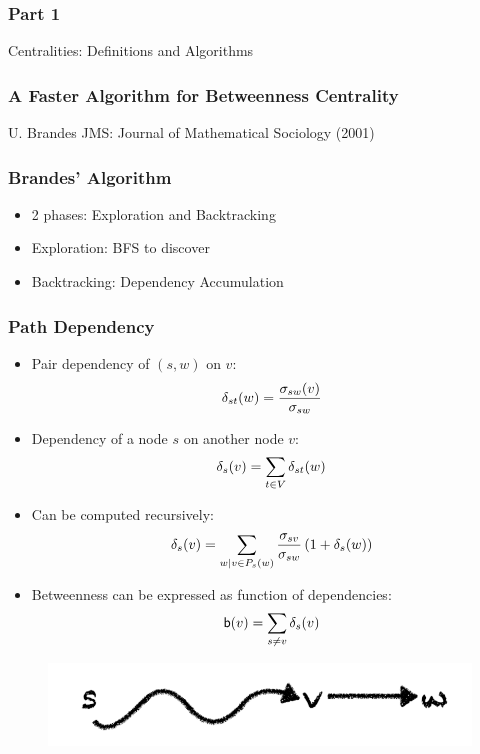 
\begin{frame}
  \frametitle{Part 1}
  \centering
  \Huge Centralities: Definitions and Algorithms
\end{frame}


\begin{frame}
  \frametitle{A Faster Algorithm for Betweenness Centrality}
  \centering
  \vfill
  {\huge U. Brandes}
  \vfill
  {\large JMS: Journal of Mathematical Sociology (2001)}
\end{frame}

\begin{frame}
  \frametitle{Brandes' Algorithm}

  \begin{itemize}
    \item 2 phases: Exploration and Backtracking
    \item Exploration: BFS to discover \allspath
    \item Backtracking: Dependency Accumulation
  \end{itemize}
\end{frame}


\begin{frame}
  \frametitle{Path Dependency}
  
  \begin{itemize}
    \item Pair dependency of $(s,w)$ on $v$:
      \[\delta_{st}(w)=\frac{\sigma_{sw}(v)}{\sigma_{sw}}\]
    \item Dependency of a node $s$ on another node $v$:
      \[\delta_s(v)=\sum_{t \in V}\delta_{st}(w)\]
    \item Can be computed recursively:
    \[
    \delta_s(v)=\sum_{w \mid v \in P_s(w) } \frac{\sigma_{sv}}{\sigma_{sw}} \left( 1 + \delta_{s}(w) \right)
    \]
    \item Betweenness can be expressed as function of dependencies:
      \[ \mathsf{b}(v) = \sum_{s \neq v} \delta_s(v) \]
  \end{itemize}
  
  \begin{figure}[H]
    \centering
    \includegraphics[scale=1]{imgs/path-dependency}
  \end{figure}
\end{frame}